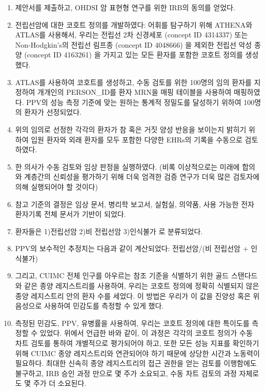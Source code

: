 \documentclass[11pt]{book}
\providecommand{\tightlist}{%
  \setlength{\itemsep}{0pt}\setlength{\parskip}{0pt}}
\theoremstyle{definition}
\theoremstyle{definition}
\theoremstyle{definition}
\theoremstyle{remark}
\begin{document}
\begin{enumerate}
\def\labelenumi{\arabic{enumi}.}
\tightlist
\item
  제안서를 제출하고, OHDSI 암 표현형 연구를 위한 IRB의 동의를 얻었다.
\item
  전립선암에 대한 코호트 정의를 개발하였다: 어휘를 탐구하기 위해
  ATHENA와 ATLAS를 사용해서, 우리는 전립선 2차 신경세포 (concept ID
  4314337) 또는 Non-Hodgkin's의 전립선 림프종 (concept ID 4048666) 을
  제외한 전립선 악성 종양 (concept ID 4163261) 을 가지고 있는 모든
  환자를 포함한 코호트 정의를 생성했다.
\item
  ATLAS를 사용하여 코호트를 생성하고, 수동 검토를 위한 100명의 임의
  환자를 지정하여 개개인의 PERSON\_ID를 환자 MRN을 매핑 테이블을
  사용하여 매핑하였다. PPV의 성능 측정 기준에 맞는 원하는 통계적
  정밀도를 달성하기 위하여 100명의 환자가 선정되었다.
\item
  위의 임의로 선정한 각각의 환자가 참 혹은 거짓 양성 반응을 보이는지
  밝히기 위하여 입원 환자와 외래 환자를 모두 포함한 다양한 EHRs의 기록을
  수동으로 검토하였다.
\item
  한 의사가 수동 검토와 임상 판정을 실행하였다. (비록 이상적으로는
  미래에 합의와 계층간의 신뢰성을 평가하기 위해 더욱 엄격한 검증 연구가
  더욱 많은 검토자에 의해 실행되어야 할 것이다)
\item
  참고 기준의 결정은 임상 문서, 병리학 보고서, 실험실, 의약품, 사용
  가능한 전자 환자기록 전체 문서가 기반이 되었다.
\item
  환자들은 1)전립선암 2)비 전립선암 3)인식불가 로 분류되었다.
\item
  PPV의 보수적인 추정치는 다음과 같이 계산되었다: 전립선암/(비 전립선암
  + 인식불가)
\item
  그리고, CUIMC 전체 인구를 아우르는 참조 기준을 식별하기 위한 골드
  스탠다드와 같은 종양 레지스트리를 사용하여, 우리는 코호트 정의에
  정확히 식별되지 않은 종양 레지스트리 안의 환자 수를 세었다. 이 방법은
  우리가 이 값을 진양성 혹은 위음성으로 사용하여 민감도를 측정할 수 있게
  했다.
\item
  측정된 민감도, PPV, 유병률을 사용하여, 우리는 코호트 정의에 대한
  특이도를 측정할 수 있었다. 위에서 언급한 바와 같이, 이 과정은 각각의
  코호트 정의가 수동 차트 검토를 통하여 개별적으로 평가되어야 하고, 또한
  모든 성능 지표를 확인하기 위해 CUIMC 종양 레지스트리와 연관되어야 하기
  때문에 상당한 시간과 노동력이 필요하다. 최대한 신속히 종양
  레지스트리의 접근 권한을 얻는 검토를 이행함에도 불구하고, IRB 승인
  과정 만으로 몇 주가 소요되고, 수동 차트 검토의 과정 자체로도 몇 주가
  더 소요된다.
\end{enumerate}
\end{document}
